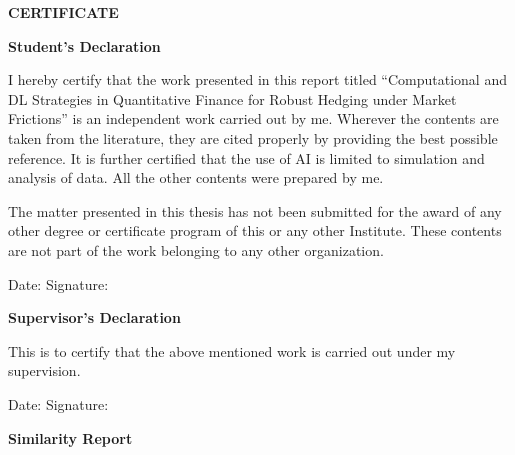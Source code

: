 \documentclass[11pt,oneside]{report}
\begin{document}
\clearpage
\thispagestyle{empty}

\begin{center}
\Large \textbf{CERTIFICATE}
\end{center}

\vspace{1.5cm}

\begin{center}
\textbf{Student's Declaration}
\end{center}

\vspace{0.5cm}

I hereby certify that the work presented in this report titled ``Computational and DL Strategies in Quantitative Finance for Robust Hedging under Market Frictions'' is an independent work carried out by me. Wherever the contents are taken from the literature, they are cited properly by providing the best possible reference. It is further certified that the use of AI is limited to simulation and analysis of data. All the other contents were prepared by me.

\vspace{0.5cm}

The matter presented in this thesis has not been submitted for the award of any other degree or certificate program of this or any other Institute. These contents are not part of the work belonging to any other organization.

\vspace{1.5cm}

\noindent
Date: \hfill Signature:

\vspace{2cm}

\begin{center}
\textbf{Supervisor's Declaration}
\end{center}

\vspace{0.5cm}

This is to certify that the above mentioned work is carried out under my supervision.

\vspace{1.5cm}

\noindent
Date: \hfill Signature:

\clearpage


\clearpage
\thispagestyle{empty}

\begin{center}
{\Large \textbf{Similarity Report}}
\end{center}
\end{document}
